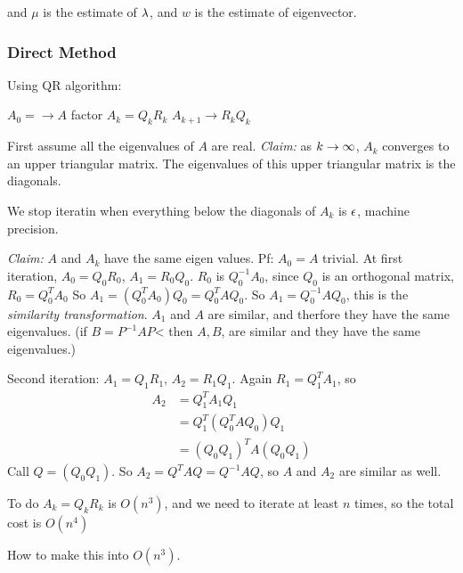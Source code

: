 and $\mu$ is the estimate of $\lambda$, and $w$ is the estimate of
eigenvector.

\subsubsection{Direct Method}\label{sec:directmethod}
Using QR algorithm:
\begin{algorithmic}
\STATE $A_0= \to A$
   \STATE factor $A_k=Q_kR_k$
   \STATE $A_{k+1} \to R_kQ_k$
\ENDFOR
\end{algorithmic}

First assume all the eigenvalues of $A$ are real.
\emph{Claim:} as $k\rightarrow \infty$, $A_k$ converges  to an upper
triangular matrix. The eigenvalues of this upper triangular matrix is
the diagonals.

We stop iteratin when everything below the diagonals of $A_k$ is $\epsilon$, machine
precision. 

\emph{Claim:} $A$ and $A_k$ have the same eigen values.
Pf: $A_0=A$ trivial.
At first iteration, $A_0 = Q_0R_0$, $A_1 = R_0Q_0$. $R_0$ is
$Q_0^{-1}A_0$, since $Q_0$ is an orthogonal matrix, $R_0=Q_0^TA_0$
So $A_1 = (Q_0^TA_0)Q_0 = Q_0^TAQ_0$. So $A_1=Q_0^{-1}AQ_0$, this is
the \emph{similarity transformation}. $A_1$ and $A$ are similar, and
therfore they have the same eigenvalues. (if $B=P^{-1}AP$< then $A,B$,
are similar and they have the same eigenvalues.)

Second iteration: $A_1 = Q_1R_1$, $A_2=R_1Q_1$. Again $R_1 =
Q_1^TA_1$, so
\begin{align*}
A_2 &= Q_1^TA_1Q_1 \\ &= Q_1^T(Q_0^TAQ_0)Q_1\\  
&=(Q_0Q_1)^TA(Q_0Q_1)
\end{align*}
Call $Q = (Q_0Q_1)$. So $A_2 = Q^TAQ=Q^{-1}AQ$, so $A$ and $A_2$ are
similar as well. 

To do $A_k=Q_kR_k$ is $O(n^3)$, and we need to iterate at least $n$ times, so
the total cost is $O(n^4)$

How to make this into $O(n^3)$.

